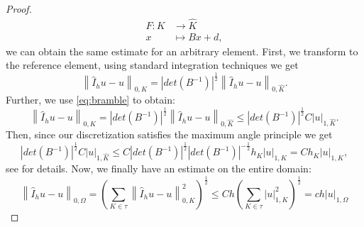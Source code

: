 \begin{proof}
\begin{equation}
\begin{aligned}
			F: K &\rightarrow \hat{K}\\
			x &\mapsto B x + d,
		\end{aligned}
	\end{equation}
	we can obtain the same estimate for an arbitrary element. First, we transform to the reference element, using standard integration techniques we get
	\begin{equation}
		\left \| \hat{I}_h u - u \right \|_{0,K}= |det(B^{-1})|^{\frac{1}{2}}\left \| \hat{I}_h u - u \right \|_{0,\hat{K}}.
	\end{equation}
	Further, we use \eqref{eq:bramble} to obtain:
	\begin{equation}
		\left \| \hat{I}_h u - u \right \|_{0,K}=|det(B^{-1})|^{\frac{1}{2}}\left \| \hat{I}_h u - u \right \|_{0,\hat{K}}\leq  |det(B^{-1})|^{\frac{1}{2}} C |u|_{1,\hat{K}}.
	\end{equation}
	Then, since our discretization satisfies the maximum angle principle we get
	\begin{equation}
		|det(B^{-1})|^{\frac{1}{2}} C |u|_{1,\hat{K}}\leq C|det(B^{-1})|^{\frac{1}{2}} |det(B^{-1})|^{-\frac{1}{2}} h_K |u|_{1,K}= C h_K |u|_{1,K},
	\end{equation}
	see \cite{Knabner} for details. Now, we finally have an estimate on the entire domain:
	\begin{equation}
		\left \| \hat{I}_h u - u \right \|_{0,\Omega} = \left (\sum_{K\in \tau}\left \| \hat{I}_h u - u \right \|_{0,K}^2 \right )^{\frac{1}{2}}\leq C h \left (\sum_{K\in \tau}| u |_{1,K}^2 \right )^{\frac{1}{2}} = c h |u|_{1,\Omega}
	\end{equation}
\end{proof}